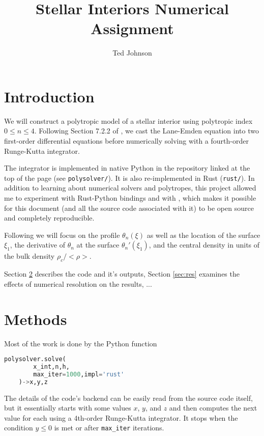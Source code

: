 \documentclass[twocolumn]{aastex631}
\begin{document}
\title{Stellar Interiors Numerical Assignment}

\author{Ted Johnson}


\section{Introduction}
\label{sec:intro}

We will construct a polytropic model of a stellar interior using
polytropic index $0\le n \le 4$. Following Section 7.2.2 of
\citet{textbook}, we cast the Lane-Emden equation into two
first-order differential equations before numerically solving
with a fourth-order Runge-Kutta integrator.

The integrator is implemented in native Python in the repository
linked at the top of the page (see \texttt{polysolver/}). It is
also re-implemented in Rust (\texttt{rust/}). In addition to
learning about numerical solvers and polytropes, this project
allowed me to experiment with Rust-Python bindings and with
\showyourwork, which makes it possible for this document (and
all the source code associated with it) to be open source and completely
reproducible.

Following \citet{textbook} we will focus on the profile $\theta_n(\xi)$
as well as the location of the surface $\xi_1$, the derivative
of $\theta_n$ at the surface $\theta_n'(\xi_1)$, and the central
density in units of the bulk density $\rho_c/<\rho>$.

Section \ref{sec:methods} describes the code and it's outputs,
Section \ref{sec:res} examines the effects of numerical resolution
on the results, ...


\section{Methods}
\label{sec:methods}
Most of the work is done by the Python function
\begin{lstlisting}[language=Python]
    polysolver.solve(
        x_int,n,h,
        max_iter=1000,impl='rust'
    )->x,y,z
\end{lstlisting}

The details of the code's backend can be easily read from
the source code itself, but it essentially starts with some
values $x$, $y$, and $z$ and then computes the next value for
each using a 4th-order Runge-Kutta integrator. It stops when
the condition $y \le 0$ is met or after \texttt{max\_iter} iterations.
\end{document}
